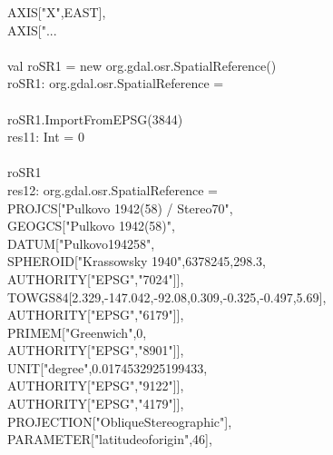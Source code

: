\documentclass {article}
\begin{document}
\hspace*{2mm} AXIS["X",EAST],\\
\hspace*{2mm} AXIS["...\\
\\
val roSR1 = new org.gdal.osr.SpatialReference()\\
roSR1: org.gdal.osr.SpatialReference = \\
\\
roSR1.ImportFromEPSG(3844) \\
res11: Int = 0 \\
\\
roSR1\\
res12: org.gdal.osr.SpatialReference = \\
PROJCS["Pulkovo 1942(58) / Stereo70",\\
\hspace*{2mm} GEOGCS["Pulkovo 1942(58)",\\
\hspace*{4mm} DATUM["Pulkovo\underline{\space}1942\underline{\space}58",\\
\hspace*{6mm} SPHEROID["Krassowsky 1940",6378245,298.3,\\
\hspace*{8mm} AUTHORITY["EPSG","7024"]],\\
\hspace*{6mm} TOWGS84[2.329,-147.042,-92.08,0.309,-0.325,-0.497,5.69],\\
\hspace*{6mm} AUTHORITY["EPSG","6179"]],\\
\hspace*{4mm} PRIMEM["Greenwich",0,\\
\hspace*{6mm} AUTHORITY["EPSG","8901"]],\\
\hspace*{4mm} UNIT["degree",0.0174532925199433,\\
\hspace*{6mm} AUTHORITY["EPSG","9122"]],\\
\hspace*{4mm} AUTHORITY["EPSG","4179"]],\\
\hspace*{2mm} PROJECTION["Oblique\underline{\space}Stereographic"],\\
\hspace*{2mm} PARAMETER["latitude\underline{\space}of\underline{\space}origin",46],\\
\end{document}
